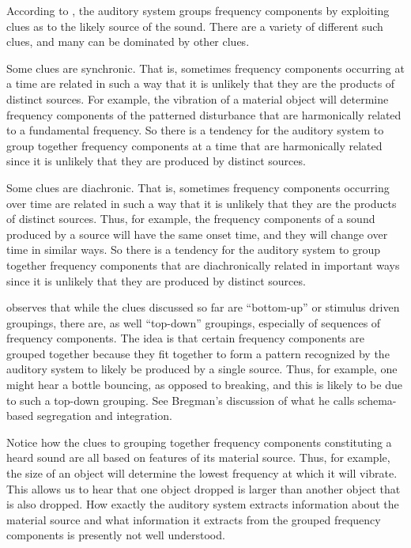According to \citet{Nudds:2009sf,Nudds:2010aa}, the auditory system groups frequency components by exploiting clues as to the likely source of the sound. There are a variety of different such clues, and many can be dominated by other clues. 

Some clues are synchronic. That is, sometimes frequency components occurring at a time are related in such a way that it is unlikely that they are the products of distinct sources. For example, the vibration of a material object will determine frequency components of the patterned disturbance that are harmonically related to a fundamental frequency. So there is a tendency for the auditory system to group together frequency components at a time that are harmonically related since it is unlikely that they are produced by distinct sources. 

Some clues are diachronic. That is, sometimes frequency components occurring over time are related in such a way that it is unlikely that they are the products of distinct sources. Thus, for example, the frequency components of a sound produced by a source will have the same onset time, and they will change over time in similar ways. So there is a tendency for the auditory system to group together frequency components that are diachronically related in important ways since it is unlikely that they are produced by distinct sources. 

\citet[74]{Nudds:2009sf} observes that while the clues discussed so far are ``bottom-up'' or stimulus driven groupings, there are, as well ``top-down'' groupings, especially of sequences of frequency components. The idea is that certain frequency components are grouped together because they fit together to form a pattern recognized by the auditory system to likely be produced by a single source. Thus, for example, one might hear a bottle bouncing, as opposed to breaking, and this is likely to be due to such a top-down grouping. See Bregman's \citeyearpar[Chapter 4]{Bregman:1990aa} discussion of what he calls schema-based segregation and integration.

Notice how the clues to grouping together frequency components constituting a heard sound are all based on features of its material source. Thus, for example, the size of an  object will determine the lowest frequency at which it will vibrate. This allows us to hear that one object dropped is larger than another object that is also dropped. How exactly the auditory system extracts information about the material source and what information it extracts from the grouped frequency components is presently not well understood. 

